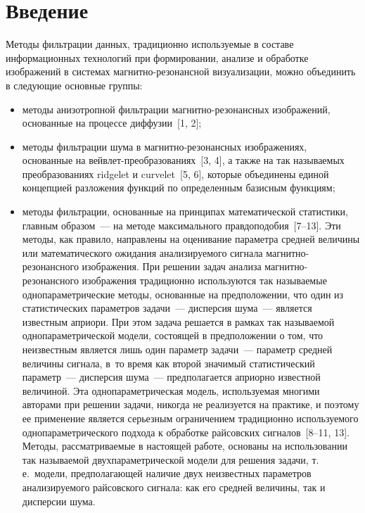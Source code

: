 \thispagestyle{headings}

\begin{multicols}{2}

\label{st\stat}

\section{Введение}

      Методы фильтрации данных, традиционно используемые в составе
информационных технологий при формировании, анализе и обработке изображений в
системах маг\-нит\-но-ре\-зо\-нансной визуализации, можно объединить в следующие
основные группы:
      \begin{itemize}
\item  методы анизотропной фильтрации магнитно-ре\-зо\-нансных изображений, основанные
на процессе диффузии~[1, 2];
      \item методы фильтрации шума в магнитно-ре\-зо\-нансных изображениях,
основанные на вейв\-лет-пре\-об\-ра\-зо\-ва\-ни\-ях~[3, 4], а также на так называемых
преобразованиях ridgelet и curvelet~[5, 6], которые объединены единой концепцией
разложения функций по определенным базисным функциям;
      \item методы фильтрации, основанные на принципах математической статистики,
главным \mbox{образом}~--- на методе максимального правдоподобия~[7--13]. Эти методы, как
правило, направле\-ны на оценивание параметра средней величины или математического
ожидания анализируемого сигнала маг\-нит\-но-ре\-зо\-нансно\-го изоб\-ра\-же\-ния. При
решении задач анализа магнитно-ре\-зо\-нансно\-го изображения традиционно
используются так на\-зы\-ва\-емые од\-но\-па\-ра\-мет\-ри\-че\-ские методы, основанные на
предположении, что один из статистических параметров задачи~--- дисперсия шума~---
является известным априори. При этом задача решается в рамках так на\-зы\-ва\-емой
однопараметрической модели, состоящей в предположении о том, что неизвестным
является лишь один параметр задачи~--- параметр средней величины сигнала, в~то время
как второй значимый статистический параметр~--- дисперсия шума~--- предполагается
априорно известной величиной. Эта однопараметрическая модель, используемая многими
авторами при решении задачи, никогда не реализуется на практике, и поэтому ее
применение является серьезным ограничением традиционно используемого
однопараметрического подхода к обработке райсовских сигналов~[8--11, 13]. Методы,
рассматриваемые в настоящей работе, основаны на использовании так на\-зы\-ва\-емой
двухпараметрической модели для решения задачи, т.\,е.\ модели, предполагающей
наличие двух неизвестных параметров анализируемого райсовского сигнала: как его
средней величины, так и дисперсии шума.
\end{itemize}


\end{multicols}
